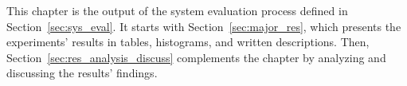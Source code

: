 This chapter is the output of the system evaluation process defined in Section~\ref{sec:sys_eval}. It starts with Section~\ref{sec:major_res}, which presents the experiments' results in tables, histograms, and written descriptions. Then, Section~\ref{sec:res_analysis_discuss} complements the chapter by analyzing and discussing the results' findings.